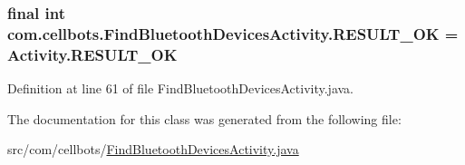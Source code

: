 \hypertarget{classcom_1_1cellbots_1_1_find_bluetooth_devices_activity_a391fbb01516687971bd2cbee8bd05821}{
\subsubsection[{R\-E\-S\-U\-L\-T\-\_\-\-O\-K}]{\setlength{\rightskip}{0pt plus 5cm}final int {\bf com.\-cellbots.\-Find\-Bluetooth\-Devices\-Activity.\-R\-E\-S\-U\-L\-T\-\_\-\-O\-K} = Activity.\-R\-E\-S\-U\-L\-T\-\_\-\-O\-K}}\label{classcom_1_1cellbots_1_1_find_bluetooth_devices_activity_a391fbb01516687971bd2cbee8bd05821}


Definition at line 61 of file Find\-Bluetooth\-Devices\-Activity.\-java.



The documentation for this class was generated from the following file\-:\begin{DoxyCompactItemize}
\item 
src/com/cellbots/\hyperlink{_find_bluetooth_devices_activity_8java}{Find\-Bluetooth\-Devices\-Activity.\-java}\end{DoxyCompactItemize}
